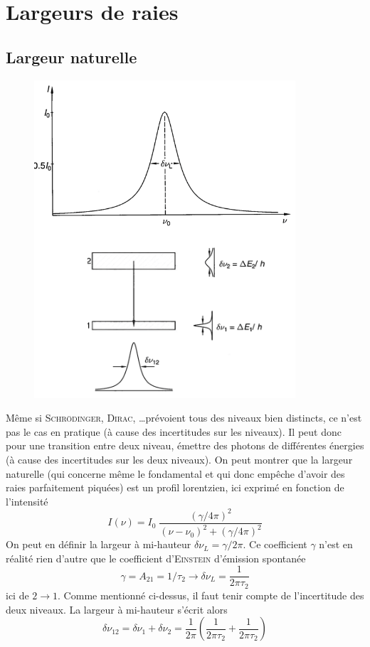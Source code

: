 \section{Largeurs de raies}
\subsection{Largeur naturelle}

	\begin{figure}
	\vspace{-5mm}
	\includegraphics[scale=0.5]{ch1/image13}
	\end{figure}
	
Même si \textsc{Schrödinger}, \textsc{Dirac}, \dots prévoient tous des niveaux bien distincts, ce 
n'est pas le cas en pratique (à cause des incertitudes sur les niveaux). Il peut donc pour une 
transition entre deux niveau, émettre des photons de différentes énergies (à cause des incertitudes
sur les deux niveaux). On peut montrer que la largeur naturelle (qui concerne même le fondamental et
qui donc empêche d'avoir des raies parfaitement piquées) est un profil lorentzien, ici exprimé 
en fonction de l'intensité
\begin{equation}
I(\nu) = I_0 \; \frac{ (\gamma / 4\pi )^2}
{ (\nu - \nu_0 )^2 + (\gamma / 4\pi )^2 }
\end{equation}
On peut en définir la largeur à mi-hauteur $\delta \nu_L = \gamma / 2 \pi$. Ce coefficient $\gamma$
n'est en réalité rien d'autre que le coefficient d'\textsc{Einstein} d'émission spontanée
\begin{equation}
\gamma = A_{21} = 1 / \tau_2 \rightarrow 
\delta \nu_L = \frac{1}{2 \pi \tau_2}
\end{equation}
ici de $2\to1$. Comme mentionné ci-dessus, il faut tenir compte de l'incertitude des deux niveaux. 
La largeur à mi-hauteur s'écrit alors
\begin{equation}
\delta\nu_{12}=\delta\nu_1+\delta\nu_2 = \frac{1}{2\pi}\left(\frac{1}{2\pi\tau_2}+\frac{1}{2\pi\tau_2}
\right)
\end{equation}



